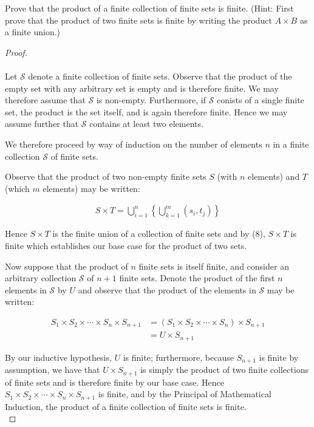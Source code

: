 Prove that the product of a finite collection of finite sets is finite.
(Hint: First prove that the product of two finite sets is finite by writing the
product $A\times B$ as a finite union.)

    \begin{proof}\ \\\\
        Let $\mathcal{S}$ denote a finite collection of finite sets.
        Observe that the product of the empty set with any arbitrary set is empty and is therefore finite.
        We may therefore assume that $\mathcal{S}$ is non-empty. Furthermore, if $\mathcal{S}$ conists of a single
        finite set, the product is the set itself, and is again therefore finite. Hence we may assume further that
        $\mathcal{S}$ contains at least two elements.

        We therefore proceed by way of induction on the number of elements $n$ in a finite collection 
        $\mathcal{S}$ of finite sets.

        Observe that the product of two non-empty finite sets $S$ (with $n$ elements) and $T$ (which $m$ elements) may
        be written:

        \begin{align*}
            S \times T = \bigcup\limits_{i=1}^{n}{\left\{\bigcup\limits_{k=1}^{m}{(s_i, t_j)}\right\}}
        \end{align*}

        Hence $S \times T$ is the finite union of a collection of finite sets and by (8), $S \times T$ is finite which
        establishes our base case for the product of two sets. 

        Now suppose that the product of $n$ finite sets is itself finite, and consider an arbitrary collection
        $\mathcal{S}$ of $n + 1$ finite sets. Denote the product of the first $n$ elements in $\mathcal{S}$ by
        $U$ and observe that the product of the elements in $\mathcal{S}$ may be written:


        \begin{align*}
            S_1 \times S_2 \times \cdots \times S_n \times S_{n+1} &= (S_1 \times S_2 \times \cdots \times S_n) \times S_{n+1} \\
                                                                   &= U \times S_{n+1} 
        \end{align*}

        By our inductive hypothesis, $U$ is finite; furthermore, because $S_{n+1}$ is finite by assumption, we have that
        $U \times S_{n+1}$ is simply the product of two finite collections of finite sets and is therefore finite by our
        base case. Hence $S_1 \times S_2 \times \cdots \times S_n \times S_{n+1}$ is finite,
        and by the Principal of Mathematical Induction, the product of a finite collection of finite sets is finite.
        \ \\
    \end{proof}